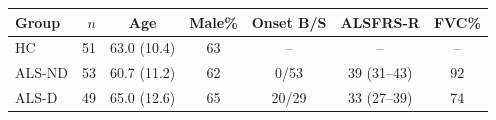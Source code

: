 \begin{tabular}{@{}lrccccc@{}}
\toprule
Group & $n$ & Age & Male\% & Onset B/S & ALSFRS-R & FVC\% \\
\midrule
HC & 51 & 63.0 (10.4) & 63 & -- & -- & -- \\
ALS-ND & 53 & 60.7 (11.2) & 62 & 0/53 & 39 (31--43) & 92 \\
ALS-D & 49 & 65.0 (12.6) & 65 & 20/29 & 33 (27--39) & 74 \\
\bottomrule
\end{tabular}
